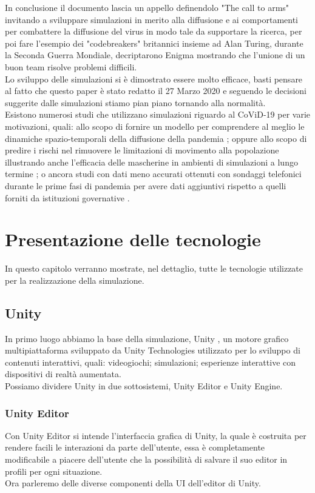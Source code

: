 \documentclass[12pt, openany]{book}
\begin{document}
	In conclusione il documento lascia un appello definendolo "The call to arms" invitando a sviluppare simulazioni in merito alla diffusione e ai comportamenti per combattere la diffusione del virus in modo tale da supportare la ricerca, per poi fare l'esempio dei "codebreakers" britannici insieme ad Alan Turing, durante la Seconda Guerra Mondiale, decriptarono Enigma mostrando che l'unione di un buon team risolve problemi difficili.\\
	Lo sviluppo delle simulazioni si è dimostrato essere molto efficace, basti pensare al fatto che questo paper è stato redatto il 27 Marzo 2020 e seguendo le decisioni suggerite dalle simulazioni stiamo pian piano tornando alla normalità.\\
	
	Esistono numerosi studi che utilizzano simulazioni riguardo al CoViD-19 per varie motivazioni, quali: allo scopo di fornire un modello per comprendere al meglio le dinamiche spazio-temporali della diffusione della pandemia \cite{Singapore}; oppure allo scopo di predire i rischi nel rimuovere le limitazioni di movimento alla popolazione illustrando anche l'efficacia delle mascherine in ambienti di simulazioni a lungo termine \cite{Madrid}; o ancora studi con dati meno accurati ottenuti con sondaggi telefonici durante le prime fasi di pandemia per avere dati aggiuntivi rispetto a quelli forniti da istituzioni governative \cite{HongKong}.
	\chapter{Presentazione delle tecnologie}
	In questo capitolo verranno mostrate, nel dettaglio, tutte le tecnologie utilizzate per la realizzazione della simulazione.
	\section{Unity}
	In primo luogo abbiamo la base della simulazione, Unity \cite{Unity}, un motore grafico multipiattaforma sviluppato da Unity Technologies utilizzato per lo sviluppo di contenuti interattivi, quali: videogiochi; simulazioni; esperienze interattive con dispositivi di realtà aumentata. \\
	Possiamo dividere Unity in due sottosistemi, Unity Editor e Unity Engine. 
	\subsection{Unity Editor}
	Con Unity Editor si intende l'interfaccia grafica di Unity, la quale è costruita per rendere facili le interazioni da parte dell'utente, essa è completamente modificabile a piacere dell'utente che la possibilità di salvare il suo editor in profili per ogni situazione.\\
	Ora parleremo delle diverse componenti della UI dell'editor di Unity.
\end{document}
